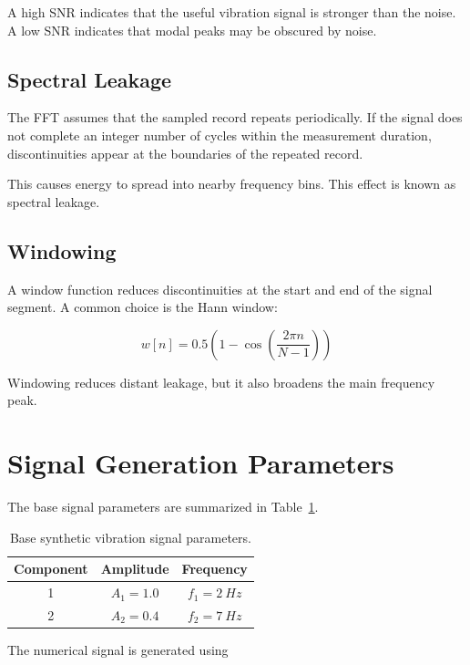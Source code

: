 \documentclass[11pt,a4paper]{article}
\begin{document}
A high SNR indicates that the useful vibration signal is stronger than the noise. A low SNR indicates that modal peaks may be obscured by noise.

\subsection{Spectral Leakage}

The FFT assumes that the sampled record repeats periodically. If the signal does not complete an integer number of cycles within the measurement duration, discontinuities appear at the boundaries of the repeated record.

This causes energy to spread into nearby frequency bins. This effect is known as spectral leakage.

\subsection{Windowing}

A window function reduces discontinuities at the start and end of the signal segment. A common choice is the Hann window:

\begin{equation}
w[n] = 0.5\left(1-\cos\left(\frac{2\pi n}{N-1}\right)\right)
\end{equation}

Windowing reduces distant leakage, but it also broadens the main frequency peak.

\section{Signal Generation Parameters}

The base signal parameters are summarized in Table~\ref{tab:base_signal}.

\begin{table}[H]
\centering
\caption{Base synthetic vibration signal parameters.}
\label{tab:base_signal}
\begin{tabular}{ccc}
\toprule
Component & Amplitude & Frequency \\
\midrule
1 & \(A_1 = 1.0\) & \(f_1 = \SI{2}{Hz}\) \\
2 & \(A_2 = 0.4\) & \(f_2 = \SI{7}{Hz}\) \\
\bottomrule
\end{tabular}
\end{table}

The numerical signal is generated using
\end{document}

